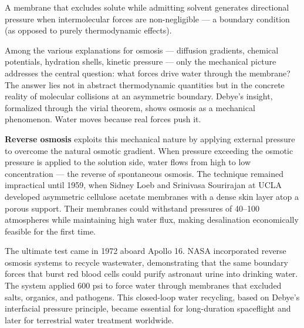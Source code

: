 A membrane that excludes solute while admitting solvent generates directional pressure when intermolecular forces are non-negligible — a boundary condition (as opposed to purely thermodynamic effects).

Among the various explanations for osmosis — diffusion gradients, chemical potentials, hydration shells, kinetic pressure — only the mechanical picture addresses the central question: what forces drive water through the membrane? The answer lies not in abstract thermodynamic quantities but in the concrete reality of molecular collisions at an asymmetric boundary. Debye's insight, formalized through the virial theorem, shows osmosis as a mechanical phenomenon. Water moves because real forces push it.

\textbf{Reverse osmosis} exploits this mechanical nature by applying external pressure to overcome the natural osmotic gradient. When pressure exceeding the osmotic pressure is applied to the solution side, water flows from high to low concentration — the reverse of spontaneous osmosis. The technique remained impractical until 1959, when Sidney Loeb and Srinivasa Sourirajan at UCLA developed asymmetric cellulose acetate membranes with a dense skin layer atop a porous support. Their membranes could withstand pressures of 40–100 atmospheres while maintaining high water flux, making desalination economically feasible for the first time.

The ultimate test came in 1972 aboard Apollo 16. NASA incorporated reverse osmosis systems to recycle wastewater, demonstrating that the same boundary forces that burst red blood cells could purify astronaut urine into drinking water. The system applied 600 psi to force water through membranes that excluded salts, organics, and pathogens. This closed-loop water recycling, based on Debye's interfacial pressure principle, became essential for long-duration spaceflight and later for terrestrial water treatment worldwide.
